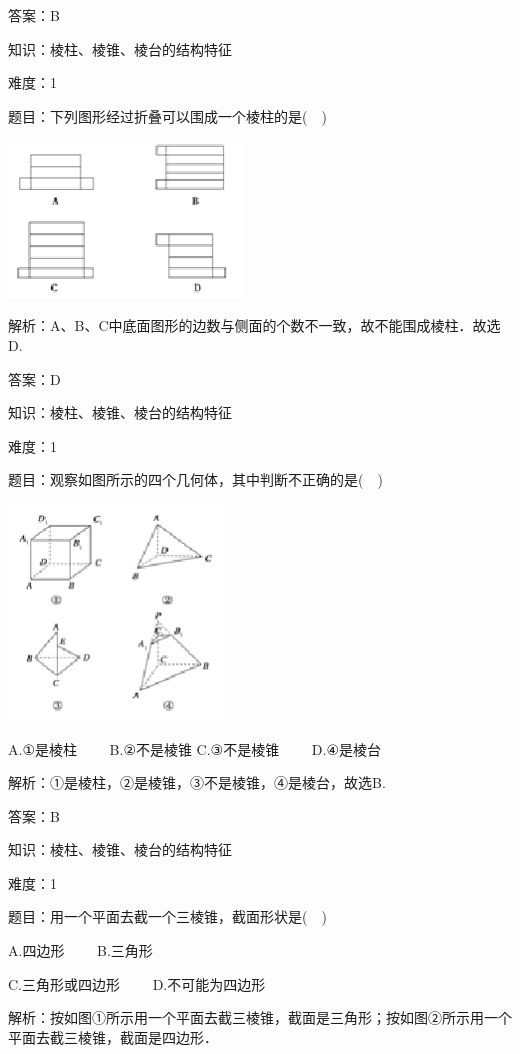 \documentclass{article} %
\begin{document}
答案：B

知识：棱柱、棱锥、棱台的结构特征

难度：1

题目：下列图形经过折叠可以围成一个棱柱的是(　)

\includegraphics*[width=2.45in, height=1.64in, keepaspectratio=false]{image5}

解析：A、B、C中底面图形的边数与侧面的个数不一致，故不能围成棱柱．故选D.

答案：D


知识：棱柱、棱锥、棱台的结构特征

难度：1

题目：观察如图所示的四个几何体，其中判断不正确的是(　)

\includegraphics*[width=2.25in, height=2.26in, keepaspectratio=false]{image6}

A.①是棱柱　　 B.②不是棱锥 C.③不是棱锥　　 D.④是棱台

解析：①是棱柱，②是棱锥，③不是棱锥，④是棱台，故选B.

答案：B

知识：棱柱、棱锥、棱台的结构特征

难度：1

题目：用一个平面去截一个三棱锥，截面形状是(　)

A.四边形　　  B.三角形

C.三角形或四边形　　 D.不可能为四边形

解析：按如图①所示用一个平面去截三棱锥，截面是三角形；按如图②所示用一个平面去截三棱锥，截面是四边形．
\end{document}
